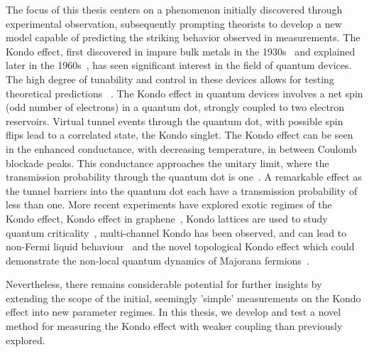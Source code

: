The focus of this thesis centers on a phenomenon initially discovered through experimental observation, subsequently prompting theorists to develop a new model capable of predicting the striking behavior observed in measurements. The Kondo effect, first discovered in impure bulk metals in the 1930s~\cite{de_haas} and explained later in the 1960s~\cite{jun_kondo}, has seen significant interest in the field of quantum devices. The high degree of tunability and control in these devices allows for testing theoretical predictions ~\cite{costi_kondo_mv_eo_regime}. 
The Kondo effect in quantum devices involves a net spin (odd number of electrons) in a quantum dot, strongly coupled to two electron reservoirs. Virtual tunnel events through the quantum dot, with possible spin flips lead to a correlated state, the Kondo singlet. The Kondo effect can be seen in the enhanced conductance, with decreasing temperature, in between Coulomb blockade peaks. This conductance approaches the unitary limit, where the transmission probability through the quantum dot is one~\cite{kondo_unitary, kondo_unitary_theory, yigal_kondo}. A remarkable effect as the tunnel barriers into the quantum dot each have a transmission probability of less than one. More recent experiments have explored exotic regimes of the Kondo effect, Kondo effect in graphene~\cite{kondo_graphene}, Kondo lattices are used to study quantum criticality~\cite{kondolattice}, multi-channel Kondo has been observed, and can lead to non-Fermi liquid
behaviour~\cite{potok_2ck, iftikhar_2ck, kirchner_2ck} and the novel topological Kondo effect which could demonstrate the non-local quantum dynamics of Majorana fermions~\cite{topological_kondo_majorana, topological_kondo, kondo_topological}.

Nevertheless, there remains considerable potential for further insights by extending the scope of the initial, seemingly 'simple' measurements on the Kondo effect into new parameter regimes. In this thesis, we develop and test a novel method for measuring the Kondo effect with weaker coupling than previously explored.


